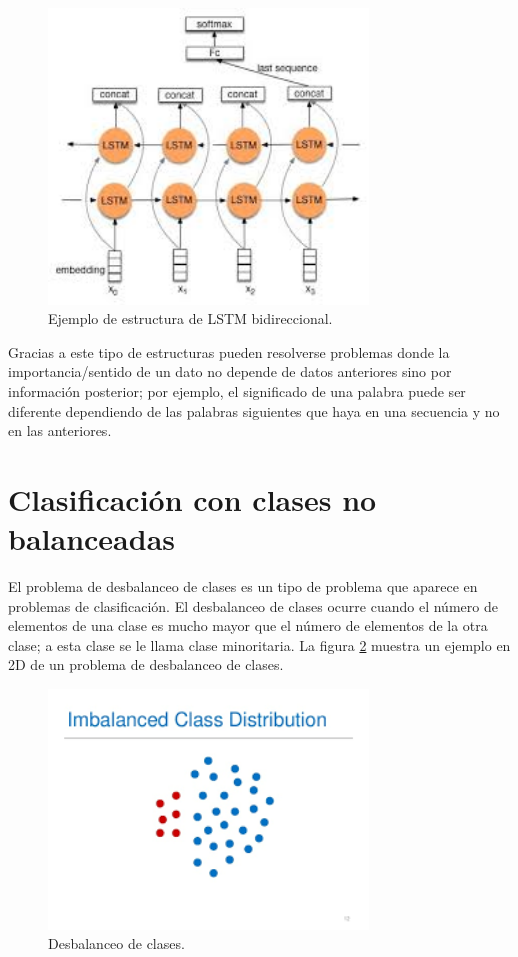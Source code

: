 \begin{figure}[h]
	\centering
	\includegraphics[width=85mm]{imagenes/bidi-lstm.jpg}
	\caption{Ejemplo de estructura de LSTM bidireccional.}
	\label{fig:23}
\end{figure}
\verticalspace
Gracias a este tipo de estructuras pueden resolverse problemas donde la importancia/sentido de un dato no depende de datos anteriores sino por información posterior; por ejemplo, el significado de una palabra puede ser diferente dependiendo de las palabras siguientes que haya en una secuencia y no en las anteriores.
\newpage
\section{Clasificación con clases no balanceadas}
El problema de desbalanceo de clases es un tipo de problema que aparece en problemas de clasificación. El desbalanceo de clases ocurre cuando el número de elementos de una clase es mucho mayor que el número de elementos de la otra clase; a esta clase se le llama clase minoritaria. La figura \ref{fig:24} muestra un ejemplo en 2D de un problema de desbalanceo de clases.\newline

\begin{figure}[h]
	\centering
	\includegraphics[width=85mm]{imagenes/imbalance_class.png}
	\caption{Desbalanceo de clases.}
	\label{fig:24}
\end{figure}
\verticalspace

